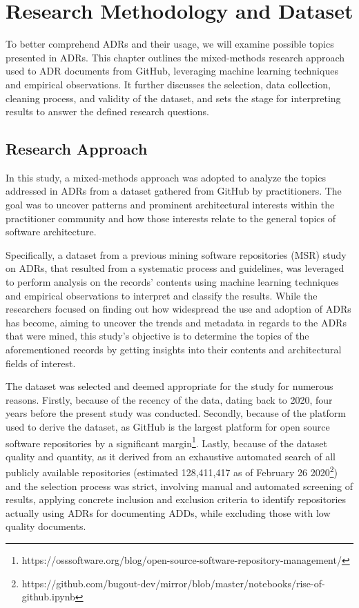 \chapter{Research Methodology and Dataset}

To better comprehend ADRs and their usage, we will examine possible topics presented in ADRs. This chapter outlines the mixed-methods research approach used to ADR documents from GitHub, leveraging machine learning techniques and empirical observations. It further discusses the selection, data collection, cleaning process, and validity of the dataset, and sets the stage for interpreting results to answer the defined research questions.

\section{Research Approach}
    In this study, a mixed-methods approach was adopted to analyze the topics addressed in ADRs from a dataset gathered from GitHub by practitioners. The goal was to uncover patterns and prominent architectural interests within the practitioner community and how those interests relate to the general topics of software architecture. 

    Specifically, a dataset from a previous mining software repositories (MSR) study on ADRs, that resulted from a systematic process and guidelines, \cite{Github_study_ADRs, MSR_systematic_process} was leveraged to perform analysis on the records' contents using machine learning techniques and empirical observations to interpret and classify the results. While the researchers focused on finding out how widespread the use and adoption of ADRs has become, aiming to uncover the trends and metadata in regards to the ADRs that were mined, this study's objective is to determine the topics of the aforementioned records by getting insights into their contents and architectural fields of interest.

    The dataset was selected and deemed appropriate for the study for numerous reasons. Firstly, because of the recency of the data, dating back to 2020, four years before the present study was conducted. Secondly, because of the platform used to derive the dataset, as GitHub is the largest platform for open source software repositories by a significant margin\footnote{https://osssoftware.org/blog/open-source-software-repository-management/}. Lastly, because of the dataset quality and quantity, as it derived from an exhaustive automated search of all publicly available repositories  (estimated 128,411,417 as of February 26 2020\footnote{https://github.com/bugout-dev/mirror/blob/master/notebooks/rise-of-github.ipynb}) and the selection process was strict, involving manual and automated screening of results, applying concrete inclusion and exclusion criteria to identify repositories actually using ADRs for documenting ADDs, while excluding those with low quality documents.

